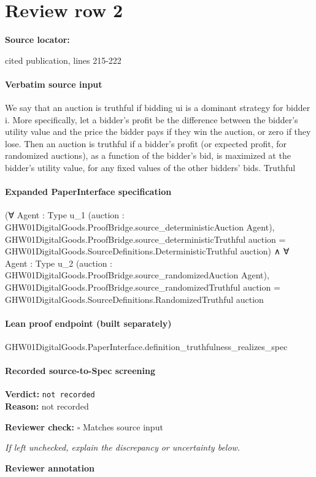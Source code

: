 \documentclass[10pt]{article}
\newcommand{\reviewerbox}{%
  \par\noindent\fbox{\parbox{0.96\linewidth}{\rule{0pt}{0.38in}}}\par
}
\newcommand{\reviewmatch}[1]{%
  \par\noindent\textbf{Reviewer check:} $\square$\; #1\par
  \noindent\emph{If left unchecked, explain the discrepancy or uncertainty below.}\par
}
\begin{document}
\section*{Review row 2}
\textbf{Source locator:} {\footnotesize\raggedright cited publication, lines 215-\allowbreak{}222\par}
\paragraph{Verbatim source input}
\begin{ReviewVerbatim}
We say that an auction is truthful if bidding ui is
a dominant strategy for bidder i. More specifically,
let a bidder’s profit be the difference between the bidder’s utility value and the price the bidder pays if they
win the auction, or zero if they lose. Then an auction
is truthful if a bidder’s profit (or expected profit, for
randomized auctions), as a function of the bidder’s
bid, is maximized at the bidder’s utility value, for
any fixed values of the other bidders’ bids. Truthful
\end{ReviewVerbatim}


\paragraph{Expanded PaperInterface specification}
\begin{ReviewVerbatim}
(∀ {Agent : Type u_1} (auction : GHW01DigitalGoods.ProofBridge.source_deterministicAuction Agent),
    GHW01DigitalGoods.ProofBridge.source_deterministicTruthful auction =
      GHW01DigitalGoods.SourceDefinitions.DeterministicTruthful auction) ∧
  ∀ {Agent : Type u_2} (auction : GHW01DigitalGoods.ProofBridge.source_randomizedAuction Agent),
    GHW01DigitalGoods.ProofBridge.source_randomizedTruthful auction =
      GHW01DigitalGoods.SourceDefinitions.RandomizedTruthful auction
\end{ReviewVerbatim}

\paragraph{Lean proof endpoint (built separately)}\begin{ReviewVerbatim}
GHW01DigitalGoods.PaperInterface.definition_truthfulness_realizes_spec
\end{ReviewVerbatim}

\paragraph{Recorded source-to-Spec screening}
\textbf{Verdict:} \texttt{not recorded}
\\
\textbf{Reason:} not recorded
\reviewmatch{Matches source input}
\noindent\textbf{Reviewer annotation}\par
\reviewerbox
\clearpage
\hypertarget{source-claim-12f62bc2b16a034f}{}
\end{document}
